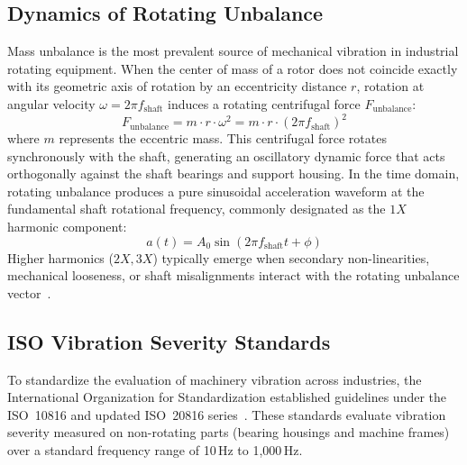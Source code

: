 \subsection{Dynamics of Rotating Unbalance}
Mass unbalance is the most prevalent source of mechanical vibration in industrial rotating equipment. When the center of mass of a rotor does not coincide exactly with its geometric axis of rotation by an eccentricity distance $r$, rotation at angular velocity $\omega = 2\pi f_{\mathrm{shaft}}$ induces a rotating centrifugal force $F_{\mathrm{unbalance}}$:
\begin{equation}
F_{\mathrm{unbalance}} = m \cdot r \cdot \omega^2 = m \cdot r \cdot (2\pi f_{\mathrm{shaft}})^2
\label{eq:unbalance_force}
\end{equation}
where $m$ represents the eccentric mass. This centrifugal force rotates synchronously with the shaft, generating an oscillatory dynamic force that acts orthogonally against the shaft bearings and support housing. In the time domain, rotating unbalance produces a pure sinusoidal acceleration waveform at the fundamental shaft rotational frequency, commonly designated as the $1X$ harmonic component:
\begin{equation}
a(t) = A_0 \sin(2\pi f_{\mathrm{shaft}} t + \phi)
\end{equation}
Higher harmonics ($2X, 3X$) typically emerge when secondary non-linearities, mechanical looseness, or shaft misalignments interact with the rotating unbalance vector~\cite{randall2011vibration}.

\subsection{ISO Vibration Severity Standards}
To standardize the evaluation of machinery vibration across industries, the International Organization for Standardization established guidelines under the ISO~10816 and updated ISO~20816 series~\cite{iso10816_3, iso20816_1}. These standards evaluate vibration severity measured on non-rotating parts (bearing housings and machine frames) over a standard frequency range of 10\,Hz to 1,000\,Hz.

